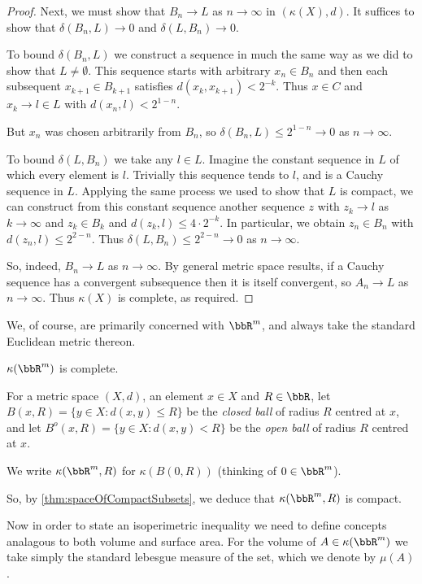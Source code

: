 \documentclass[a4paper,11pt]{article}
\begin{document}
\begin{proof}
Next, we must show that $B_n\to L$ as $n\to\infty$
in $(\kappa(X),d)$.  It suffices to show
that $\delta(B_n,L)\to0$ and $\delta(L,B_n)\to0$.

To bound $\delta(B_n,L)$ we construct a sequence in much the same way as we did
to show that $L\not=\emptyset$.  This sequence starts with arbitrary $x_n\in
B_n$ and then each subsequent $x_{k+1}\in B_{k+1}$ satisfies
$d(x_k,x_{k+1})<2^{-k}$.  Thus $x\in C$ and $x_k\to l\in L$ with
$d(x_n,l)<2^{1-n}$.

But $x_n$ was chosen arbitrarily from $B_n$, so $\delta(B_n,L)\leq2^{1-n}\to0$
as $n\to\infty$.

To bound $\delta(L,B_n)$ we take any $l\in L$.  Imagine the constant sequence
in $L$ of which every element is $l$.  Trivially this sequence tends to $l$,
and is a Cauchy sequence in $L$.  Applying the same process we used to show
that $L$ is compact, we can construct from this constant sequence another
sequence $z$ with $z_k\to l$ as $k\to\infty$ and $z_k\in B_k$ and
$d(z_k,l)\leq4\cdot2^{-k}$.  In particular, we obtain $z_n\in B_n$ with
$d(z_n,l)\leq2^{2-n}$.  Thus $\delta(L,B_n)\leq2^{2-n}\to0$ as $n\to\infty$.

So, indeed, $B_n\to L$ as $n\to\infty$.  By general metric space results, if a
Cauchy sequence has a convergent subsequence then it is itself convergent, so
$A_n\to L$ as $n\to\infty$.  Thus $\kappa(X)$ is complete, as required.
\end{proof}

We, of course, are primarily concerned with $\bbR^m$, and always take
the standard Euclidean metric thereon.

\begin{corollary}
$\kappa(\bbR^m)$ is complete.
\end{corollary}

\begin{defn}
For a metric space $(X,d)$, an element $x\in X$ and $R\in\bbR$, let
$B(x,R)=\{y\in X:d(x,y)\leq R\}$ be the \emph{closed ball}
of radius $R$ centred at $x$, and let
$B^o(x,R)=\{y\in X:d(x,y)<R\}$ be the \emph{open ball}
of radius $R$ centred at $x$.

We write $\kappa(\bbR^m,R)$ for $\kappa(B(0,R))$ (thinking of $0\in\bbR^m$).
\end{defn}

So, by \ref{thm:spaceOfCompactSubsets}, we deduce that $\kappa(\bbR^m,R)$ is
compact.

Now in order to state an isoperimetric inequality we need to define concepts
analagous to both volume and surface area.  For the volume of
$A\in\kappa(\bbR^m)$ we take simply the standard lebesgue measure of the set,
which we denote by $\mu(A)$.
\end{document}
